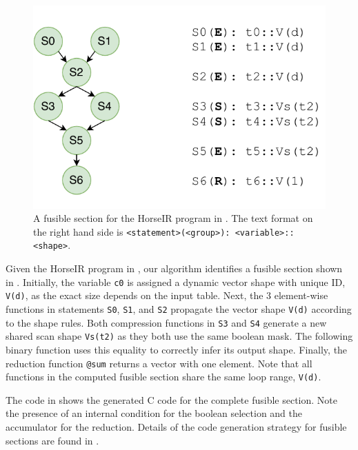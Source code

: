\begin{figure}[htbp]
\centering
\includegraphics[width=.7\columnwidth]{./src/figure/graph-example.pdf}
\caption{A fusible section for the HorseIR program in . The
text format on the right hand side is \texttt{<statement>(<group>): <variable>::<shape>}.}
\label{fig:fusion_example}
\end{figure}

Given the HorseIR program in , our algorithm identifies a
fusible section shown in . Initially, the variable \texttt{c0}
is assigned a dynamic vector shape with unique ID, \texttt{V(d)}, as the exact size depends
on the input table. Next, the 3 element-wise functions in statements \texttt{S0},
\texttt{S1}, and \texttt{S2} propagate the vector shape \texttt{V(d)} according to the shape
rules. Both compression functions in \texttt{S3} and \texttt{S4} generate a new shared scan shape
\texttt{Vs(t2)} as they both use the same boolean mask. The following binary function
uses this equality to correctly infer its output shape. Finally, the reduction function
\texttt{@sum} returns a vector with one element. Note that all functions in the computed
fusible section share the same loop range, \texttt{V(d)}.

The code in  shows the generated C code for the complete
fusible section. Note the presence of an internal condition for the boolean selection
and the accumulator for the reduction. Details of the code generation strategy for fusible
sections are found in .



